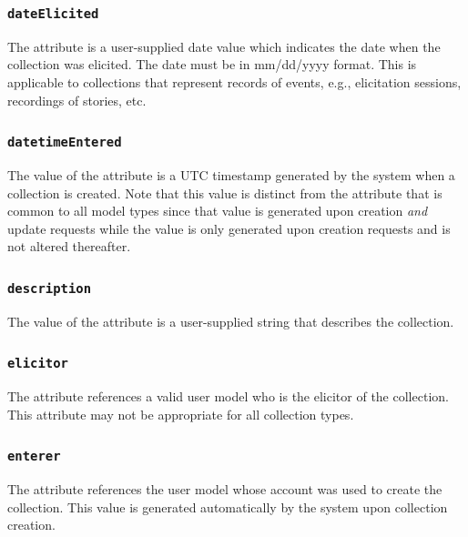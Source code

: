 \documentclass[letterpaper,10pt,english]{sphinxmanual}
\begin{document}
\subsubsection{\texttt{dateElicited}}
\label{datastructure:dateelicited}
The  attribute is a user-supplied date value which indicates the
date when the collection was elicited.  The date must be in mm/dd/yyyy format.
This is applicable to collections that represent records of events, e.g.,
elicitation sessions, recordings of stories, etc.


\subsubsection{\texttt{datetimeEntered}}
\label{datastructure:datetimeentered}
The value of the  attribute is a UTC timestamp generated by
the system when a collection is created.  Note that this value is distinct from
the  attribute that is common to all model types since that
value is generated upon creation \emph{and} update requests while the
 value is only generated upon creation requests and is not
altered thereafter.


\subsubsection{\texttt{description}}
\label{datastructure:description}
The value of the  attribute is a user-supplied string that
describes the collection.


\subsubsection{\texttt{elicitor}}
\label{datastructure:elicitor}
The  attribute references a valid user model who is the elicitor of
the collection.  This attribute may not be appropriate for all collection types.


\subsubsection{\texttt{enterer}}
\label{datastructure:enterer}
The  attribute references the user model whose account was used to
create the collection.  This value is generated automatically by the system upon
collection creation.
\end{document}

